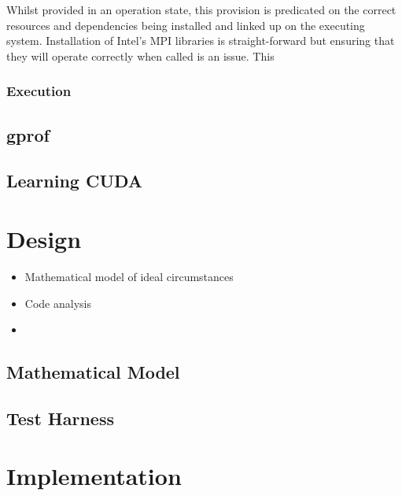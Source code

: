 \documentclass[conference]{IEEEtran}
\begin{document}
Whilst provided in an operation state, this provision is predicated on the correct resources and dependencies being installed and linked up on the executing system. Installation of Intel's MPI libraries is straight-forward but ensuring that they will operate correctly when called is an issue. This

\subsubsection{Execution}


\subsection{gprof}


\subsection{Learning CUDA}



\section{Design}

\begin{itemize}
    \item Mathematical model of ideal circumstances
    \item Code analysis
    \item 
\end{itemize}

\subsection{Mathematical Model}


\subsection{Test Harness}






\section{Implementation}
\end{document}
